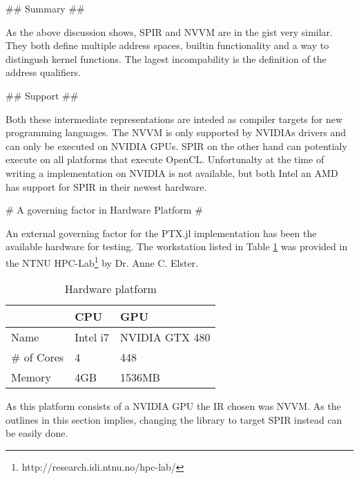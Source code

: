 \begin{markdown}
## Summary ## 

As the above discussion shows, SPIR and NVVM are in the gist very
similar. They both define multiple address spaces, builtin
functionality and a way to distingush kernel functions. The lagest
incompability is the definition of the address qualifiers. 

## Support ##

Both these intermediate representations are inteded as compiler
targets for new programming languages. The NVVM is only supported by
NVIDIAs drivers and can only be executed on NVIDIA GPUs. SPIR on the
other hand can potentialy execute on all platforms that execute
OpenCL. Unfortunalty at the time of writing a implementation on NVIDIA
is not available, but both Intel an AMD has support for SPIR in their
newest hardware.

# A governing factor in Hardware Platform #

An external governing factor for the PTX.jl implementation has been the
available hardware for testing. The workstation listed in Table
\ref{tab:hw} was provided in the NTNU
HPC-Lab\footnote{http://research.idi.ntnu.no/hpc-lab/} by Dr. Anne
C. Elster.


\begin{table}[H]
  \centering
  \begin{tabular}{|l|l|l|}
    \hline
    & CPU & GPU \\
    \hline
    \hline
    Name & Intel i7 & NVIDIA GTX 480 \\
    \hline
    \# of Cores & 4 & 448 \\
    \hline
    Memory & 4GB & 1536MB \\
    \hline
  \end{tabular}
  \caption{Hardware platform}
  \label{tab:hw}
\end{table}

As this platform consists of a NVIDIA GPU the IR chosen was NVVM. As
the outlines in this section implies, changing the library to target
SPIR instead can be easily done.

\end{markdown}
